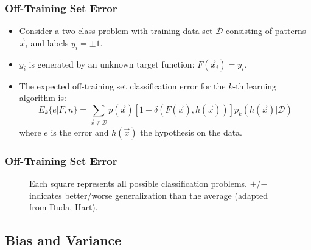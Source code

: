 \begin{frame}
  \frametitle{Off-Training Set Error \cont}
  
  \begin{itemize}
    \item Consider a two-class problem with training data set ${\mathcal{D}}$ consisting of patterns $\vec x_i$ and labels $y_i = \pm 1$. \pause
    \item $y_i$ is generated by an unknown target function: $F(\vec x_i) = y_i$. \pause
    \item The expected off-training set classification error for the $k$-th learning algorithm is:
      \begin{displaymath}
        E_k \{e | F, n\} = \sum_{\vec x \notin {\mathcal{D}}} p(\vec x) \left[ 1 - \delta(F(\vec x), h(\vec x)) \right] p_k(h(\vec x) | {\mathcal{D}})
      \end{displaymath}
      where $e$ is the error and $h(\vec x)$ the hypothesis on the data.
  \end{itemize}
\end{frame}


\begin{frame}
  \frametitle{Off-Training Set Error \cont}

  \begin{figure}
    \centering
    \resizebox{0.7\linewidth}{!}{
      
    }
    \vspace*{0.5cm}
    \caption{\footnotesize Each square represents all possible classification problems. $+$/$-$ indicates better/worse generalization than the average (adapted from Duda, Hart).}
  \end{figure}
\end{frame}


\subsection{Bias and Variance}

